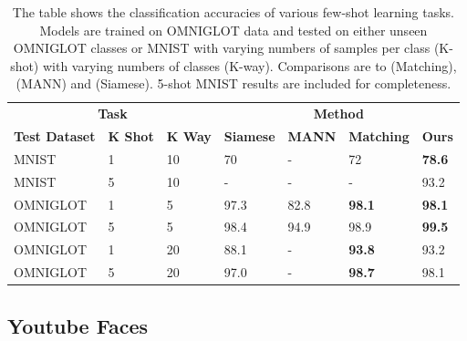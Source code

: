 \documentclass{article} %
\begin{document}
\begin{table}[!hb]
    \centering
    \begin{tabular}{  l  l  l |  l l l l}
    \multicolumn{3}{c|}{\bf{Task}} & \multicolumn{4}{c}{\bf{Method}} \\
     \bf{Test Dataset} & \bf{K Shot} & \bf{K Way}  &\bf{Siamese} & \bf{MANN} & \bf{Matching} & \bf{Ours}  \\ \hline
    MNIST    & 1  & 10  & 70   & -    & 72   & \bf{78.6} \\ 
    MNIST    & 5  & 10  & -    & -    &  -   & 93.2 \\ 
    OMNIGLOT & 1  & 5   & 97.3 & 82.8 & \bf{98.1} & \bf{98.1} \\ 
    OMNIGLOT & 5  & 5   & 98.4 & 94.9 & 98.9 & \bf{99.5} \\ 
    OMNIGLOT & 1  & 20  & 88.1 & -    & \bf{93.8} & 93.2 \\  
    OMNIGLOT & 5  & 20  & 97.0 & -    & \bf{98.7} & 98.1 \\
    \end{tabular}
\caption{The table shows the classification accuracies of various few-shot learning tasks. Models are trained on OMNIGLOT data and tested on either unseen OMNIGLOT classes or MNIST with varying numbers of samples per class (K-shot) with varying numbers of classes (K-way). Comparisons are to \cite{matching} (Matching), \cite{mann} (MANN) and \cite{siamese_one_shot} (Siamese). 5-shot MNIST results are included for completeness.}
\label{table:small_shot_classification}
\end{table}

\subsection{Youtube Faces}
\end{document}
